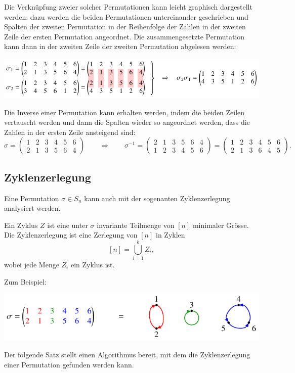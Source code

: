Die Verknüpfung zweier solcher Permutationen kann leicht graphisch
dargestellt werden: dazu werden die beiden Permutationen
untereinander geschrieben und Spalten der zweiten Permutation
in der Reihenfolge der Zahlen in der zweiten Zeile der ersten
Permutation angeordnet.
Die zusammengesetzte Permutation kann dann in der zweiten Zeile
der zweiten Permutation abgelesen werden:
\begin{center}
\includegraphics{chapters/50-permutationen/images/komposition.pdf}
\end{center}
Die Inverse einer Permutation kann erhalten werden, indem die beiden
Zeilen vertauscht werden und dann die Spalten wieder so angeordnet werden,
dass die Zahlen in der ersten Zeile ansteigend sind:
\[
\sigma = \begin{pmatrix}
1&2&3&4&5&6\\
2&1&3&5&6&4
\end{pmatrix}
\qquad\Rightarrow\qquad
\sigma^{-1}
=
\begin{pmatrix}
2&1&3&5&6&4\\
1&2&3&4&5&6
\end{pmatrix}
=
\begin{pmatrix}
1&2&3&4&5&6\\
2&1&3&6&4&5
\end{pmatrix}.
\]

\subsection{Zyklenzerlegung
\label{buch:subsection:zyklenzerlegung}}
Eine Permutation $\sigma\in S_n$ kann auch mit der sogenanten Zyklenzerlegung
%
analysiert werden.

\begin{definition}
Ein Zyklus $Z$ ist eine unter $\sigma$ invariante Teilmenge von $[n]$
minimaler Grösse.
%
%
%
Die Zyklenzerlegung ist eine Zerlegung von $[n]$ in Zyklen
\[
[n]
=
\bigcup_{i=1}^k Z_i,
\]
wobei jede Menge $Z_i$ ein Zyklus ist.
\end{definition}

Zum Beispiel:
\begin{center}
\includegraphics{chapters/50-permutationen/images/zyklenzerlegung.pdf}
\end{center}
Der folgende Satz stellt einen Algorithmus bereit, mit dem die
Zyklenzerlegung einer Permutation gefunden werden kann.

